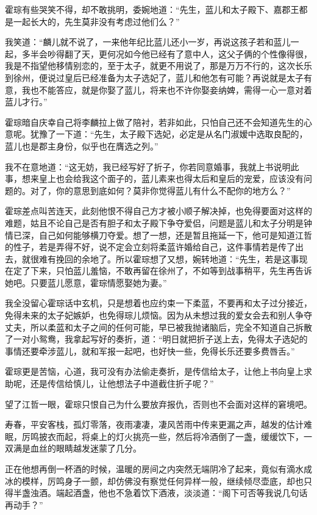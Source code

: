 霍琮有些哭笑不得，却不敢挑明，委婉地道：“先生，蓝儿和太子殿下、嘉郡王都是一起长大的，先生莫非没有考虑过他们么？”

我笑道：“麟儿就不说了，一来他年纪比蓝儿还小一岁，再说这孩子若和蓝儿一起，多半会吵得翻了天，更何况如今他已经有了意中人，这父子俩的个性像得很，我是不指望他移情别恋的，至于太子，就更不用说了，那是万万不行的，这次长乐到徐州，便说过皇后已经准备为太子选妃了，蓝儿和他怎有可能？再说就是太子有意，我也不能答应，就是你娶了蓝儿，将来也不许你娶妾纳婢，需得一心一意对着蓝儿才行。”

霍琮暗自庆幸自己将李麟拉上做了陪衬，若非如此，只怕自己还不会知道先生的心意呢。犹豫了一下道：“先生，太子殿下选妃，必定是从名门淑嫒中选取良配的，蓝儿也是郡主身份，似乎也在膺选之列。”

我不在意地道：“这无妨，我已经写好了折子，你若同意婚事，我就上书说明此事，想来皇上也会给我这个面子的，蓝儿素来也得太后和皇后的宠爱，应该没有问题的。对了，你的意思到底如何？莫非你觉得蓝儿有什么不配你的地方么？”

霍琮差点叫苦连天，此刻他恨不得自己方才被小顺子解决掉，也免得要面对这样的难题，姑且不论自己是否有胆子和太子殿下争夺爱侣，问题是蓝儿和太子分明是钟情已深，自己如何能够横刀夺爱。想了一想，还是暂且拖延一下，他可是知道江哲的性子，若是弄得不好，说不定会立刻将柔蓝许婚给自己，这件事情若是传了出去，就很难有挽回的余地了。所以霍琮想了又想，婉转地道：“先生，若是这事现在定了下来，只怕蓝儿羞恼，不敢再留在徐州了，不如等到战事稍平，先生再告诉她吧。只要蓝儿愿意，霍琮情愿娶她为妻。”

我全没留心霍琮话中玄机，只是想着也应约束一下柔蓝，不要再和太子过分接近，免得未来的太子妃嫉妒，也免得琮儿烦恼。因为从未想过我的爱女会去和别人争夺丈夫，所以柔蓝和太子之间的任何可能，早已被我抛诸脑后，完全不知道自己拆散了一对小鸳鸯，我拿起写好的奏折，道：“明日就把折子送上去，免得太子选妃的事情还要牵涉蓝儿，就和军报一起吧，也好快一些，免得长乐还要多费唇舌。”

霍琮更是苦恼，心道，我可没有办法偷走奏折，是传信给太子，让他上书向皇上求助呢，还是传信给慎儿，让他想法子中道截住折子呢？”

望了江哲一眼，霍琮只恨自己为什么要放弃报仇，否则也不会面对这样的窘境吧。

寿春，平安客栈，孤灯零落，夜雨凄凄，凄风苦雨中传来更漏之声，越发的估计难眠，厉鸣披衣而起，将桌上的灯火挑亮一些，然后将冷酒倒了一盏，缓缓饮下，一双满是血丝的眼睛越发迷蒙了几分。

正在他想再倒一杯酒的时候，温暖的房间之内突然无端阴冷了起来，竟似有滴水成冰的模样，厉鸣身子一颤，却仿佛没有察觉任何异样一般，继续倾尽壶底，却也只得半盏浊酒。端起酒盏，他也不急着饮下酒液，淡淡道：“阁下可否等我说几句话再动手？”


